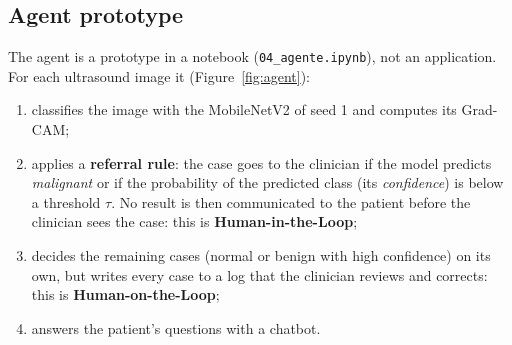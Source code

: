 \documentclass{article}
\begin{document}
\subsection{Agent prototype}
\label{sec:agent}
The agent is a prototype in a notebook (\texttt{04\_agente.ipynb}), not an application. For
each ultrasound image it (Figure~\ref{fig:agent}):
\begin{enumerate}
\item classifies the image with the MobileNetV2 of seed 1 and computes its Grad-CAM;
\item applies a \textbf{referral rule}: the case goes to the clinician if the model predicts
\emph{malignant} or if the probability of the predicted class (its \emph{confidence}) is
below a threshold $\tau$. No result is then communicated to the patient before the
clinician sees the case: this is \textbf{Human-in-the-Loop};
\item decides the remaining cases (normal or benign with high confidence) on its own, but
writes every case to a log that the clinician reviews and corrects: this is
\textbf{Human-on-the-Loop};
\item answers the patient's questions with a chatbot.
\end{enumerate}
\end{document}
